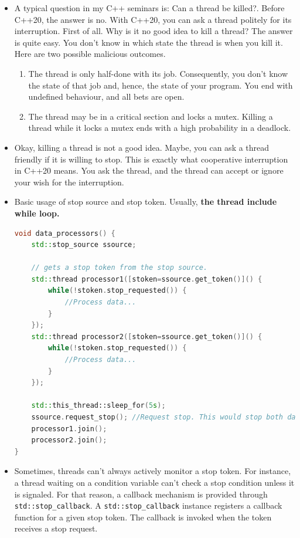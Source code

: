 \documentclass[a4paper,11pt,twoside]{book}
\begin{document}
\begin{itemize}
	\item A typical question in my C++ seminars is: Can a thread be killed?. Before C++20, the answer is no. With C++20, you can ask a thread politely for its interruption. First of all. Why is it no good idea to kill a thread? The answer is quite easy. You don't know in which state the thread is when you kill it. Here are two possible malicious outcomes.

	\begin{enumerate}
		\item 	The thread is only half-done with its job. Consequently, you don't know the state of that job and, hence, the state of your program. You end with undefined behaviour, and all bets are open.
		
		\item 	The thread may be in a critical section and locks a mutex. Killing a thread while it locks a mutex ends with a high probability in a deadlock.
		
	\end{enumerate}
	
	\item Okay, killing a thread is not a good idea. Maybe, you can ask a thread friendly if it is willing to stop. This is exactly what cooperative interruption in C++20 means. You ask the thread, and the thread can accept or ignore your wish for the interruption.
	
	\item Basic usage of stop source and stop token. Usually, \textbf{the thread include while loop. }
\begin{lstlisting}[frame=single, language=c++]	
void data_processors() {
	std::stop_source ssource;
		
	// gets a stop token from the stop source.
	std::thread processor1([stoken=ssource.get_token()]() {
		while(!stoken.stop_requested()) {
			//Process data...
		}     
	});    
	std::thread processor2([stoken=ssource.get_token()]() {
		while(!stoken.stop_requested()) {
			//Process data...
		}     
	});

	std::this_thread::sleep_for(5s);
	ssource.request_stop(); //Request stop. This would stop both data processors.	
	processor1.join();
	processor2.join();
}
\end{lstlisting}

	\item Sometimes, threads can't always actively monitor a stop token. For instance, a thread waiting on a condition variable can't check a stop condition unless it is signaled. For that reason, a callback mechanism is provided through \texttt{std::stop\_callback}. A \texttt{std::stop\_callback} instance registers a callback function for a given stop token. The callback is invoked when the token receives a stop request.


\end{itemize}
\end{document}
